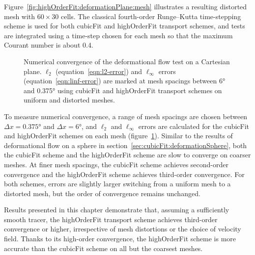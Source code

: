 Figure~\ref{fig:highOrderFit:deformationPlane:mesh} illustrates a resulting distorted mesh with $60 \times 30$ cells.
The classical fourth-order Runge–Kutta time-stepping scheme is used for both cubicFit and highOrderFit transport schemes, and tests are integrated using a time-step chosen for each mesh so that the maximum Courant number is about \num{0.4}.  
\begin{figure}
	\centering
	
	\caption{Numerical convergence of the deformational flow test on a Cartesian plane.
	$\ell_2$ (equation~\ref{eqn:l2-error}) and $\ell_\infty$ errors (equation~\ref{eqn:linf-error}) are marked at mesh spacings between \ang{6} and \ang{0.375} using cubicFit and highOrderFit transport schemes on uniform and distorted meshes.}
	\label{fig:highOrderFit:deformationPlane:convergence}
\end{figure}

To measure numerical convergence, a range of mesh spacings are chosen between $\Delta x = \ang{0.375}$ and $\Delta x = \ang{6}$, and $\ell_2$ and $\ell_\infty$ errors are calculated for the cubicFit and highOrderFit schemes on each mesh (figure~\ref{fig:highOrderFit:deformationPlane:convergence}).
Similar to the results of deformational flow on a sphere in section~\ref{sec:cubicFit:deformationSphere}, both the cubicFit scheme and the highOrderFit scheme are slow to converge on coarser meshes.
At finer mesh spacings, the cubicFit scheme achieves second-order convergence and the highOrderFit scheme achieves third-order convergence.
For both schemes, errors are slightly larger switching from a uniform mesh to a distorted mesh, but the order of convergence remains unchanged.

Results presented in this chapter demonstrate that, assuming a sufficiently smooth tracer, the highOrderFit transport scheme achieves third-order convergence or higher, irrespective of mesh distortions or the choice of velocity field.
Thanks to its high-order convergence, the highOrderFit scheme is more accurate than the cubicFit scheme on all but the coarsest meshes.
